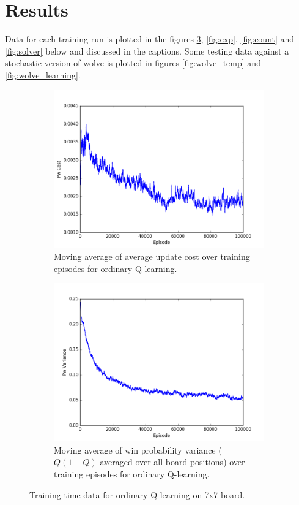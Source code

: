 \documentclass{article}
\begin{document}
\section*{Results}
Data for each training run is plotted in the figures \ref{fig:Q}, \ref{fig:exp}, \ref{fig:count} and \ref{fig:solver} below and discussed in the captions. Some testing data against a stochastic version of wolve is plotted in figures \ref{fig:wolve_temp} and \ref{fig:wolve_learning}.
\begin{figure}[!ht]
\centering
\begin{subfigure}[t]{.45\textwidth}
  \centering
      \includegraphics[width=1\textwidth]{pics/7x7_Q_Pw_cost.png}
  \caption{Moving average of average update cost over training episodes for ordinary Q-learning.}
  \label{fig:Q_cost}
\end{subfigure}\hfill
\begin{subfigure}[t]{.45\textwidth}
  \centering
      \includegraphics[width=1\textwidth]{pics/7x7_Q_Pw_var.png}
  \caption{Moving average of win probability variance ($Q(1-Q)$ averaged over all board positions) over training episodes for ordinary Q-learning.}
  \label{fig:Q_var}
\end{subfigure}
\caption{Training time data for ordinary Q-learning on 7x7 board.}
\label{fig:Q}
\end{figure}
\end{document}
